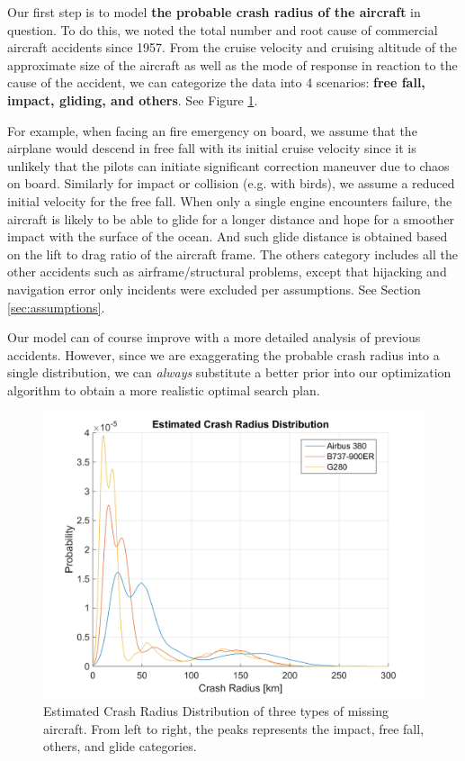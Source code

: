 \documentclass[12pt, letterpaper]{article}  %
\theoremstyle{definition}
\theoremstyle{remark}
\theoremstyle{plain}
\begin{document}
Our first step is to model\textbf{ the probable crash radius of the aircraft} in question. To do this, we noted the total number and root cause of commercial aircraft accidents since 1957\cite{as}. From the cruise velocity and cruising altitude of the approximate size of the aircraft as well as the mode of response in reaction to the cause of the accident, we can categorize the data into 4 scenarios: \textbf{free fall, impact, gliding, and others}. See Figure \ref{fig:CrashRadius}.

For example, when facing an fire emergency on board, we assume that the airplane would descend in free fall with its initial cruise velocity since it is unlikely that the pilots can initiate significant correction maneuver due to chaos on board. Similarly for impact or collision (e.g. with birds), we assume a reduced initial velocity for the free fall. When only a single engine encounters failure, the aircraft is likely to be able to glide for a longer distance and hope for a smoother impact with the surface of the ocean. And such glide distance is obtained based on the lift to drag ratio of the aircraft frame. The others category includes all the other accidents such as airframe/structural problems, except that hijacking and navigation error only incidents were excluded per assumptions. See Section \ref{sec:assumptions}.

Our model can of course improve with a more detailed analysis of previous accidents. However, since we are exaggerating the probable crash radius into a single distribution, we can \textit{always} substitute a better prior into our optimization algorithm to obtain a more realistic optimal search plan.

\begin{center}
	\begin{figure}[H]
		\centering
		\includegraphics[width=0.9\linewidth]{figures/CrashRadiusExplain.png}
		\caption{Estimated Crash Radius Distribution of three types of missing aircraft. From left to right, the peaks represents the impact, free fall, others, and glide categories.}
		\label{fig:CrashRadius}
	\end{figure}
\end{center}
\end{document}
